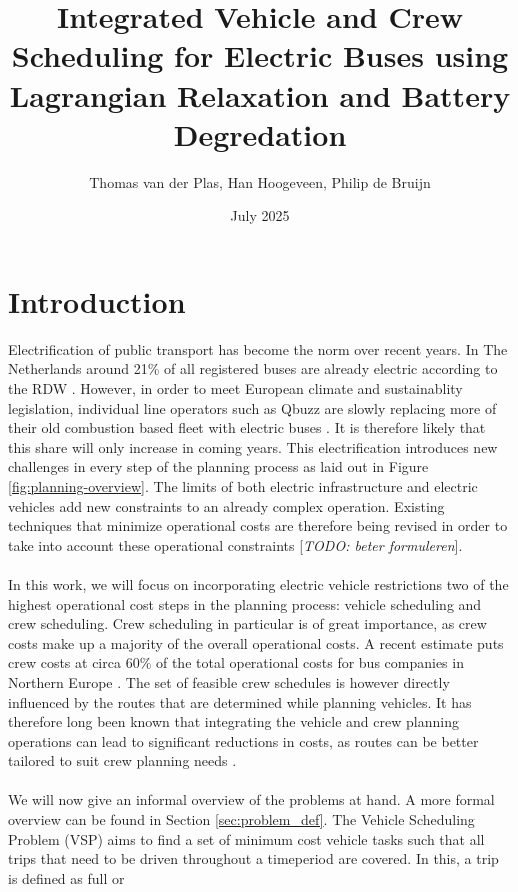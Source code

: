 \documentclass[ht]{article}
\title{Integrated Vehicle and Crew Scheduling for Electric Buses using Lagrangian Relaxation and Battery Degredation}
\date{July 2025}
\author{Thomas van der Plas, Han Hoogeveen, Philip de Bruijn}
\newcommand{\todo}[1]{{\color{red}[\textit{TODO: #1}]}}
\begin{document}
\maketitle

\section{Introduction}
Electrification of public transport has become the norm over recent years. In
The Netherlands around 21\% of all registered buses are already electric
according to the RDW \cite{RDW}. However, in order to meet European climate and
sustainablity legislation, individual line operators such as Qbuzz are slowly
replacing more of their old combustion based fleet with electric buses
\cite{europaRegulation20181999,qbuzzQbuzz}. It is therefore likely that this
share will only increase in coming years. This electrification introduces new
challenges in every step of the planning process as laid out in Figure
\ref{fig:planning-overview}. The limits of both electric infrastructure and
electric vehicles add new constraints to an already complex operation. Existing
techniques that minimize operational costs are therefore being revised in order
to take into account these operational constraints \todo{beter formuleren}.
\\\\ In this work, we will focus on incorporating electric vehicle restrictions
two of the highest operational cost steps in the planning process: vehicle
scheduling and crew scheduling. Crew scheduling in particular is of great
importance, as crew costs make up a majority of the overall operational costs.
A recent estimate puts crew costs at circa $60\%$ of the total operational
costs for bus companies in Northern Europe \cite{Perumal2019Crew}. The set of
feasible crew schedules is however directly influenced by the routes that are
determined while planning vehicles. It has therefore long been known that
integrating the vehicle and crew planning operations can lead to significant
reductions in costs, as routes can be better tailored to suit crew planning
needs \cite{Bodin1983}. \\\\ We will now give an informal overview of the
problems at hand. A more formal overview can be found in Section
\ref{sec:problem_def}. The Vehicle Scheduling Problem (VSP) aims to find a set
of minimum cost vehicle tasks such that all trips that need to be driven
throughout a timeperiod are covered. In this, a trip is defined as full or
\end{document}
